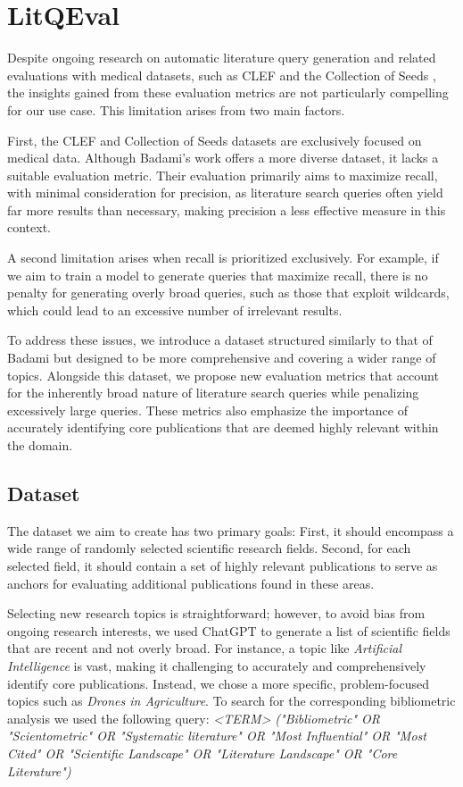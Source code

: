 \chapter{LitQEval}\label{ch:ownApproach}
Despite ongoing research on automatic literature query generation and related evaluations with medical datasets, such as CLEF \autocite{kanoulas2017clef, kanoulas2018clef, kanoulas2019clef} and the Collection of Seeds \autocite{Wang_2022}, the insights gained from these evaluation metrics are not particularly compelling for our use case. This limitation arises from two main factors. 

First, the CLEF and Collection of Seeds datasets are exclusively focused on medical data. Although Badami's work \autocite{badami2023adaptive} offers a more diverse dataset, it lacks a suitable evaluation metric. Their evaluation primarily aims to maximize recall, with minimal consideration for precision, as literature search queries often yield far more results than necessary, making precision a less effective measure in this context. 

A second limitation arises when recall is prioritized exclusively. For example, if we aim to train a model to generate queries that maximize recall, there is no penalty for generating overly broad queries, such as those that exploit wildcards, which could lead to an excessive number of irrelevant results.

To address these issues, we introduce a dataset structured similarly to that of Badami \autocite{badami2023adaptive} but designed to be more comprehensive and covering a wider range of topics. Alongside this dataset, we propose new evaluation metrics that account for the inherently broad nature of literature search queries while penalizing excessively large queries. These metrics also emphasize the importance of accurately identifying core publications that are deemed highly relevant within the domain.


\section{Dataset}
The dataset we aim to create has two primary goals: First, it should encompass a wide range of randomly selected scientific research fields. Second, for each selected field, it should contain a set of highly relevant publications to serve as anchors for evaluating additional publications found in these areas.

Selecting new research topics is straightforward; however, to avoid bias from ongoing research interests, we used ChatGPT to generate a list of scientific fields that are recent and not overly broad. For instance, a topic like \textit{Artificial Intelligence} is vast, making it challenging to accurately and comprehensively identify core publications. Instead, we chose a more specific, problem-focused topics such as \textit{Drones in Agriculture}. To search for the corresponding bibliometric analysis we used the following query: \textit{<TERM>  ("Bibliometric" OR "Scientometric" OR "Systematic literature" OR "Most Influential" OR "Most Cited" OR "Scientific Landscape" OR "Literature Landscape" OR "Core Literature")} 


